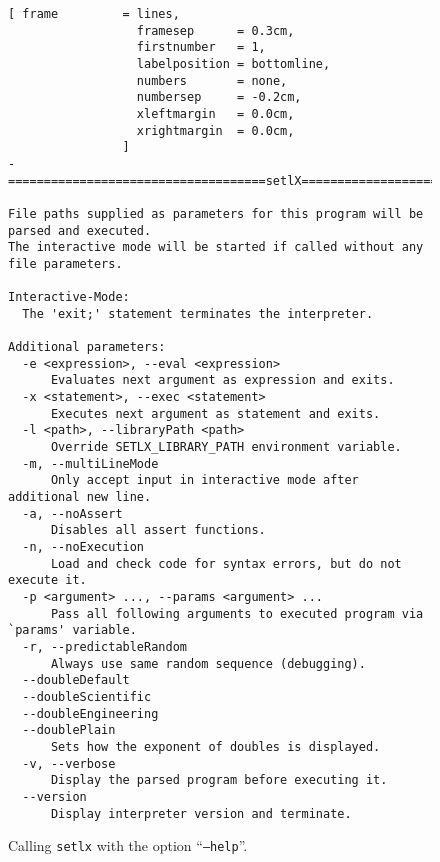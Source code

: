\begin{figure}[!ht]
\centering
\begin{Verbatim}[ frame         = lines, 
                  framesep      = 0.3cm, 
                  firstnumber   = 1,
                  labelposition = bottomline,
                  numbers       = none,
                  numbersep     = -0.2cm,
                  xleftmargin   = 0.0cm,
                  xrightmargin  = 0.0cm,
                ]
-====================================setlX=============================v2.3.1=-

File paths supplied as parameters for this program will be parsed and executed.
The interactive mode will be started if called without any file parameters.

Interactive-Mode:
  The 'exit;' statement terminates the interpreter.

Additional parameters:
  -e <expression>, --eval <expression>
      Evaluates next argument as expression and exits.
  -x <statement>, --exec <statement>
      Executes next argument as statement and exits.
  -l <path>, --libraryPath <path>
      Override SETLX_LIBRARY_PATH environment variable.
  -m, --multiLineMode
      Only accept input in interactive mode after additional new line.
  -a, --noAssert
      Disables all assert functions.
  -n, --noExecution
      Load and check code for syntax errors, but do not execute it.
  -p <argument> ..., --params <argument> ...
      Pass all following arguments to executed program via `params' variable.
  -r, --predictableRandom
      Always use same random sequence (debugging).
  --doubleDefault
  --doubleScientific
  --doubleEngineering
  --doublePlain
      Sets how the exponent of doubles is displayed.
  -v, --verbose
      Display the parsed program before executing it.
  --version
      Display interpreter version and terminate.
\end{Verbatim}
\vspace*{-0.3cm}
\caption{Calling \texttt{setlx} with the option ``\texttt{--help}''.}
\label{fig:help-option}
\end{figure}


